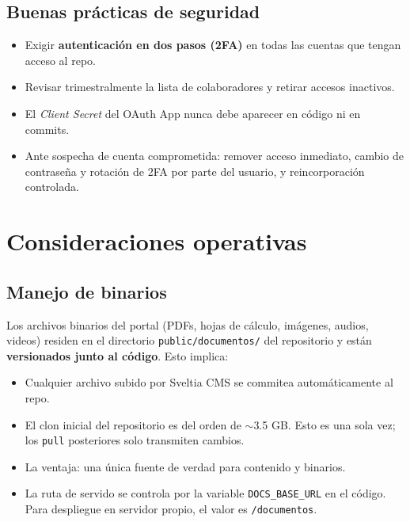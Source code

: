 \documentclass[11pt,a4paper]{article}
\begin{document}
\subsection{Buenas prácticas de seguridad}

\begin{itemize}[leftmargin=*]
  \item Exigir \textbf{autenticación en dos pasos (2FA)} en todas las cuentas que tengan acceso al repo.
  \item Revisar trimestralmente la lista de colaboradores y retirar accesos inactivos.
  \item El \textit{Client Secret} del OAuth App nunca debe aparecer en código ni en commits.
  \item Ante sospecha de cuenta comprometida: remover acceso inmediato, cambio de contraseña y rotación de 2FA por parte del usuario, y reincorporación controlada.
\end{itemize}

\newpage

\section{Consideraciones operativas}

\subsection{Manejo de binarios}

Los archivos binarios del portal (PDFs, hojas de cálculo, imágenes, audios, videos) residen en el directorio \texttt{public/documentos/} del repositorio y están \textbf{versionados junto al código}. Esto implica:

\begin{itemize}[leftmargin=*]
  \item Cualquier archivo subido por Sveltia CMS se commitea automáticamente al repo.
  \item El clon inicial del repositorio es del orden de $\sim$3.5 GB. Esto es una sola vez; los \texttt{pull} posteriores solo transmiten cambios.
  \item La ventaja: una única fuente de verdad para contenido y binarios.
  \item La ruta de servido se controla por la variable \texttt{DOCS\_BASE\_URL} en el código. Para despliegue en servidor propio, el valor es \texttt{/documentos}.
\end{itemize}
\end{document}
